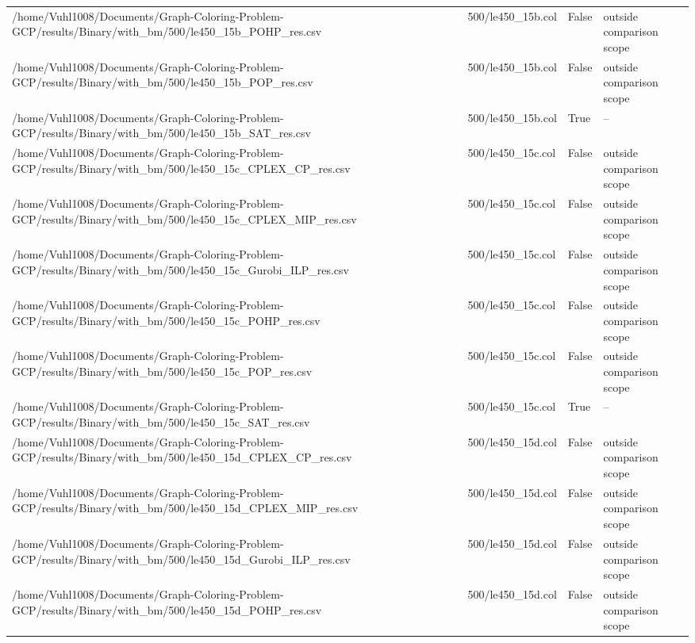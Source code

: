 \begin{table}[htbp]
\begin{tabular}{llll}
/home/Vuhl1008/Documents/Graph-Coloring-Problem-GCP/results/Binary/with\_bm/500/le450\_15b\_POHP\_res.csv & 500/le450\_15b.col & False & outside comparison scope \\
/home/Vuhl1008/Documents/Graph-Coloring-Problem-GCP/results/Binary/with\_bm/500/le450\_15b\_POP\_res.csv & 500/le450\_15b.col & False & outside comparison scope \\
/home/Vuhl1008/Documents/Graph-Coloring-Problem-GCP/results/Binary/with\_bm/500/le450\_15b\_SAT\_res.csv & 500/le450\_15b.col & True & -- \\
/home/Vuhl1008/Documents/Graph-Coloring-Problem-GCP/results/Binary/with\_bm/500/le450\_15c\_CPLEX\_CP\_res.csv & 500/le450\_15c.col & False & outside comparison scope \\
/home/Vuhl1008/Documents/Graph-Coloring-Problem-GCP/results/Binary/with\_bm/500/le450\_15c\_CPLEX\_MIP\_res.csv & 500/le450\_15c.col & False & outside comparison scope \\
/home/Vuhl1008/Documents/Graph-Coloring-Problem-GCP/results/Binary/with\_bm/500/le450\_15c\_Gurobi\_ILP\_res.csv & 500/le450\_15c.col & False & outside comparison scope \\
/home/Vuhl1008/Documents/Graph-Coloring-Problem-GCP/results/Binary/with\_bm/500/le450\_15c\_POHP\_res.csv & 500/le450\_15c.col & False & outside comparison scope \\
/home/Vuhl1008/Documents/Graph-Coloring-Problem-GCP/results/Binary/with\_bm/500/le450\_15c\_POP\_res.csv & 500/le450\_15c.col & False & outside comparison scope \\
/home/Vuhl1008/Documents/Graph-Coloring-Problem-GCP/results/Binary/with\_bm/500/le450\_15c\_SAT\_res.csv & 500/le450\_15c.col & True & -- \\
/home/Vuhl1008/Documents/Graph-Coloring-Problem-GCP/results/Binary/with\_bm/500/le450\_15d\_CPLEX\_CP\_res.csv & 500/le450\_15d.col & False & outside comparison scope \\
/home/Vuhl1008/Documents/Graph-Coloring-Problem-GCP/results/Binary/with\_bm/500/le450\_15d\_CPLEX\_MIP\_res.csv & 500/le450\_15d.col & False & outside comparison scope \\
/home/Vuhl1008/Documents/Graph-Coloring-Problem-GCP/results/Binary/with\_bm/500/le450\_15d\_Gurobi\_ILP\_res.csv & 500/le450\_15d.col & False & outside comparison scope \\
/home/Vuhl1008/Documents/Graph-Coloring-Problem-GCP/results/Binary/with\_bm/500/le450\_15d\_POHP\_res.csv & 500/le450\_15d.col & False & outside comparison scope \\

\end{tabular}
\end{table}

